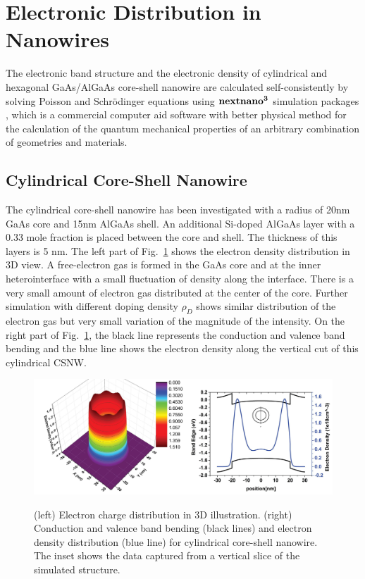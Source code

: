 \section{Electronic Distribution in Nanowires} \label{sec:spectra}

The electronic band structure and the electronic density of cylindrical and
hexagonal GaAs/AlGaAs core-shell nanowire are calculated self-consistently by
solving Poisson and Schr{\"o}dinger equations
\cite{wong2011nanoscale,bertoni2011electron} using $\bf{nextnano^3}$ simulation
packages \cite{birner2007nextnano}, which is a commercial computer aid software
with better physical method for the calculation of the quantum mechanical
properties of an arbitrary combination of geometries and materials.

\subsection{Cylindrical Core-Shell Nanowire}

The cylindrical core-shell nanowire has been investigated with a radius of 20nm
GaAs core and 15nm AlGaAs shell. An additional Si-doped AlGaAs layer with a
0.33 mole fraction is placed between the core and shell. The thickness of this
layers is 5 nm. The left part of Fig.~\ref{CylindricalCSNW} shows the electron
density distribution in 3D view. A free-electron gas is formed in the GaAs core
and at the inner heterointerface with a small fluctuation of density along the
interface. There is a very small amount of electron gas distributed at the
center of the core. Further simulation with different doping density $\rho_D$
shows similar distribution of the electron gas but very small variation of the
magnitude of the intensity. On the right part of Fig.~\ref{CylindricalCSNW},
the black line represents the conduction and valence band bending and the blue
line shows the electron density along the vertical cut of this cylindrical
CSNW.

\begin{figure}
  \caption{(left) Electron charge distribution in 3D illustration. (right) Conduction and valence band bending (black lines) and electron density distribution (blue line) for cylindrical core-shell nanowire. The inset shows the data captured from a vertical slice of the simulated structure.}
  \centering
  \includegraphics[width=\textwidth]{pictures/ED/CylindricalCSNW}
  \label{CylindricalCSNW}
\end{figure}

